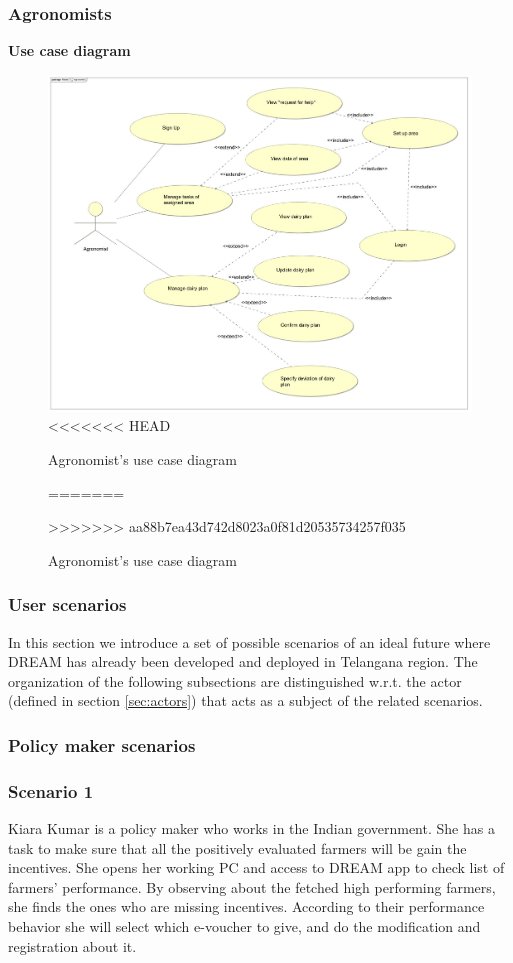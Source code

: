 \subsubsection{Agronomists}
\textbf{\textcolor{myblue}{Use case diagram}}
\begin{figure}[H]
	\centering
    \includegraphics[page=1, width=\textwidth]{Images/ud_ag.JPG}
<<<<<<< HEAD
	\caption{\label{fig:a_use_case_diagram}Agronomist's use case diagram}
=======
	\caption{\label{fig:use_case_diagram}Agronomist's use case diagram}
>>>>>>> aa88b7ea43d742d8023a0f81d20535734257f035
\end{figure}
\label{sect:agronomist_requirements}


\subsubsection{User scenarios}
In this section we introduce a set of possible scenarios of an ideal future where DREAM has already been developed and deployed in Telangana region. The organization of the following subsections are distinguished w.r.t. the actor (defined in section \ref{sec:actors}) that acts as a subject of the related scenarios.
\subsubsection{Policy maker scenarios}

\subsubsection*{Scenario 1}
Kiara Kumar is a policy maker who works in the Indian government. She has a task to make sure that all the positively evaluated farmers will be gain the incentives. She opens her working PC and access to DREAM app to check list of farmers' performance. By observing about the fetched high performing farmers, she finds the ones who are missing incentives. According to their performance behavior she will select which e-voucher to give, and do the modification and registration about it.

